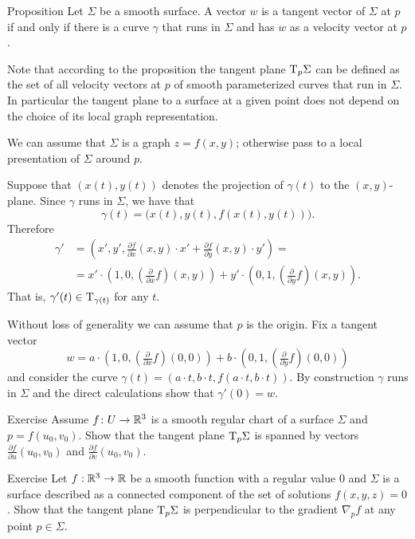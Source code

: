 \begin{thm}{Proposition}
Let $\Sigma$ be a smooth surface.
A vector $w$ is a tangent vector of $\Sigma$ at $p$ if and only if there is a curve $\gamma$ that runs in $\Sigma$ and has $w$ as a velocity vector at $p$.  
\end{thm}

Note that according to the proposition the tangent plane $\mathrm{T}_p\Sigma$ can be defined as the set of all velocity vectors at $p$ of smooth parameterized curves that run in $\Sigma$. 
In particular the tangent plane to a surface at a given point does not depend on the choice of its local graph representation.

We can assume that $\Sigma$ is a graph $z=f(x,y)$; 
otherwise pass to a local presentation of $\Sigma$ around $p$.

Suppose that $(x(t),y(t))$ denotes the projection of $\gamma(t)$ to the $(x,y)$-plane.
Since $\gamma$ runs in $\Sigma$, we have that
\[\gamma(t)=\bigl(x(t),y(t),f(x(t),y(t))\bigr).\]
Therefore 
\begin{align*}
\gamma'&=(x',y',\tfrac{\partial f}{\partial x}(x,y)\cdot x'+\tfrac{\partial f}{\partial y}(x,y)\cdot y')=
\\
&=x'\cdot (1,0,(\tfrac{\partial}{\partial x}f)(x,y))+y'\cdot (0,1,(\tfrac{\partial}{\partial y}f)(x,y)).
\end{align*}
That is, $\gamma'(t)\in\mathrm{T}_{\gamma(t)}$ for any $t$.

Without loss of generality we can assume that $p$ is the origin.
Fix a tangent vector 
\[w=a\cdot (1,0,(\tfrac{\partial}{\partial x}f)(0,0))+b\cdot(0,1,(\tfrac{\partial}{\partial y}f)(0,0))\] 
and consider the curve $\gamma(t)=(a\cdot t, b\cdot t, f(a\cdot t,b\cdot t))$.
By construction $\gamma$ runs in $\Sigma$ and the direct calculations show that $\gamma'(0)=w$.
\qeds

\begin{thm}{Exercise}\label{ex:tangent-chart}
Assume $f\colon U\to\mathbb{R}^3$ is a smooth regular chart of a surface $\Sigma$ and $p=f(u_0,v_0)$.
Show that the tangent plane $\mathrm{T}_p\Sigma$ is spanned by vectors $\tfrac{\partial f}{\partial u}(u_0,v_0)$ and $\tfrac{\partial f}{\partial v}(u_0,v_0)$.
\end{thm}

\begin{thm}{Exercise}\label{ex:tangent-normal}
Let $f:\mathbb{R}^3\to\mathbb{R}$ be a smooth function with a regular value $0$ and $\Sigma$ is a surface described as a connected component of the set of solutions $f(x,y,z)=0$.
Show that the tangent plane $\mathrm{T}_p\Sigma$ is perpendicular to the gradient $\nabla_pf$ at any point $p\in\Sigma$.
\end{thm}

